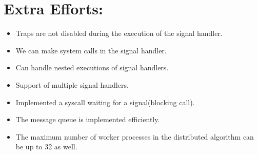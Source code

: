 \documentclass[a4 paper]{article}
\begin{document}
\section{Extra Efforts:}
\begin{itemize}
  \item Traps are not disabled during the execution of the signal handler.
  \item We can make system calls in the signal handler.
  \item Can handle nested executions of signal handlers.
  \item Support of multiple signal handlers.
  \item Implemented a syscall waiting for a signal(blocking call).
  \item The message queue is implemented efficiently.
  \item The maximum number of worker processes in the distributed algorithm can be up to 32 as well.
\end{itemize}
\end{document}
